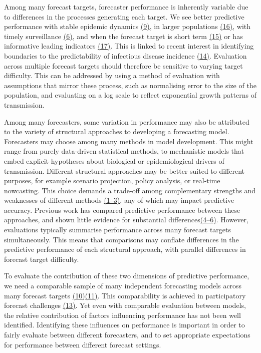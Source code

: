 \documentclass[
  letterpaper,
  DIV=11,
  numbers=noendperiod]{scrartcl}
\begin{document}
Among many forecast targets, forecaster performance is inherently
variable due to differences in the processes generating each target. We
see better predictive performance with stable epidemic dynamics
\href{https://www.zotero.org/google-docs/?KaFMKc}{(9)}, in larger
populations \href{https://www.zotero.org/google-docs/?7uCfbD}{(16)},
with timely surveillance
\href{https://www.zotero.org/google-docs/?YLVYXN}{(6)}, and when the
forecast target is short term
\href{https://www.zotero.org/google-docs/?2K90bo}{(15)} or has
informative leading indicators
\href{https://www.zotero.org/google-docs/?gzkBxT}{(17)}. This is linked
to recent interest in identifying boundaries to the predictability of
infectious disease incidence
\href{https://www.zotero.org/google-docs/?CZumUU}{(14)}. Evaluation
across multiple forecast targets should therefore be sensitive to
varying target difficulty. This can be addressed by using a method of
evaluation with assumptions that mirror these process, such as
normalising error to the size of the population, and evaluating on a log
scale to reflect exponential growth patterns of transmission.

Among many forecasters, some variation in performance may also be
attributed to the variety of structural approaches to developing a
forecasting model. Forecasters may choose among many methods in model
development. This might range from purely data-driven statistical
methods, to mechanistic models that embed explicit hypotheses about
biological or epidemiological drivers of transmission. Different
structural approaches may be better suited to different purposes, for
example scenario projection, policy analysis, or real-time nowcasting.
This choice demands a trade-off among complementary strengths and
weaknesses of different methods
\href{https://www.zotero.org/google-docs/?XemggF}{(1--3)}, any of which
may impact predictive accuracy. Previous work has compared predictive
performance between these approaches, and shown little evidence for
substantial
differences\href{https://www.zotero.org/google-docs/?piAg9a}{(4--6)}.
However, evaluations typically summarise performance across many
forecast targets simultaneously. This means that comparisons may
conflate differences in the predictive performance of each structural
approach, with parallel differences in forecast target difficulty.

To evaluate the contribution of these two dimensions of predictive
performance, we need a comparable sample of many independent forecasting
models across many forecast targets
\href{https://www.zotero.org/google-docs/?8yn1XI}{(10)}\href{https://www.zotero.org/google-docs/?ZgO6IM}{(11)}.
This comparability is achieved in participatory forecast challenges
\href{https://www.zotero.org/google-docs/?7pIGoa}{(13)}. Yet even with
comparable evaluation between models, the relative contribution of
factors influencing performance has not been well identified.
Identifying these influences on performance is important in order to
fairly evaluate between different forecasters, and to set appropriate
expectations for performance between different forecast settings.
\end{document}
